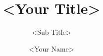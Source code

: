 \documentclass[a4paper,11pt]{article}
\begin{document}
\title{<Your Title>}
\subtitle{<Sub-Title>}
\author{<Your Name>}







%
%
\end{document}
